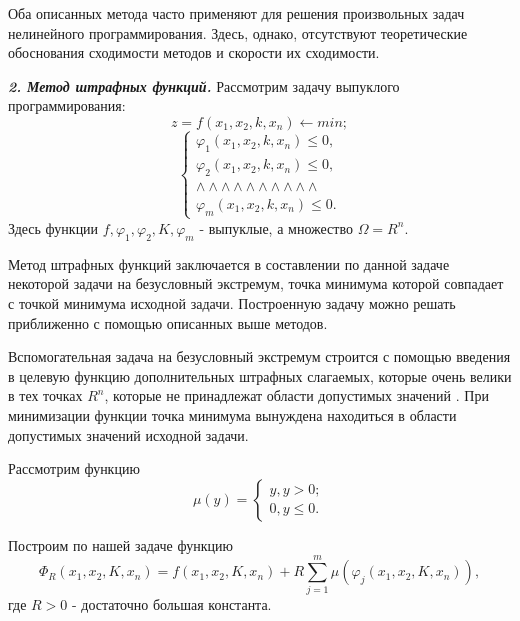 {Оба описанных метода часто применяют для решения произвольных задач нелинейного программирования. Здесь, однако, отсутствуют теоретические обоснования сходимости методов и скорости их сходимости.

\textbf{\textit{2. Метод штрафных функций.}} Рассмотрим задачу выпуклого программирования:
\begin{equation*}
z = f(x_{1}, x_{2}, k, x_{n}) \leftarrow min;
\end{equation*}
\begin{equation*}
\begin{cases}
\varphi_{1}(x_{1}, x_{2}, k, x_{n}) \leq 0,
\\
\varphi_{2}(x_{1}, x_{2}, k, x_{n}) \leq 0,
\\
\wedge \wedge \wedge \wedge \wedge \wedge \wedge \wedge \wedge \wedge
\\
\varphi_{m}(x_{1}, x_{2}, k, x_{n}) \leq 0.
\end{cases}
\end{equation*}
Здесь функции $f, \varphi_{1},  \varphi_{2}, K, \varphi_{m}$ - выпуклые, а множество 	$\Omega=R^{n}.$

Метод штрафных функций заключается в составлении по данной задаче некоторой задачи на безусловный экстремум, точка минимума которой совпадает с точкой минимума исходной задачи. Построенную
задачу можно решать приближенно с помощью описанных выше методов.

Вспомогательная задача на безусловный экстремум строится с  помощью введения в целевую функцию дополнительных штрафных слагаемых, которые очень велики в тех точках $R^{n}$, которые не принадлежат области допустимых значений  . При минимизации функции точка минимума вынуждена находиться в области допустимых значений исходной задачи.

Рассмотрим функцию
\begin{equation*}
\mu (y) =
\begin{cases}
y, y > 0;
\\
0, y \leq 0.
\end{cases}
\end{equation*}

Построим по нашей задаче функцию
\begin{equation*}
\Phi_{R} (x_{1}, x_{2}, K, x_{n}) = f(x_{1}, x_{2}, K, x_{n}) + R\sum_{j=1}^{m}\mu(\varphi_{j}(x_{1}, x_{2}, K, x_{n})),
\end{equation*}
где $R>0$ - достаточно большая константа.


}
